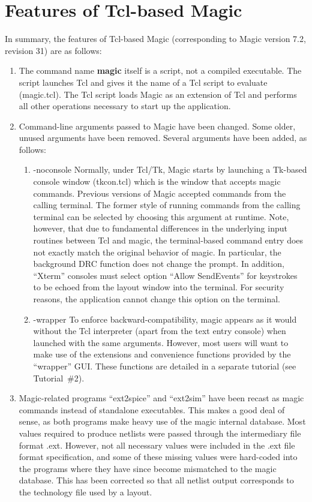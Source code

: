 \documentclass[letterpaper,twoside,12pt]{article}
\begin{document}
\section{Features of Tcl-based Magic}

In summary, the features of Tcl-based Magic (corresponding to Magic version
7.2, revision 31) are as follows:

\begin{enumerate}
   \item The command name {\bfseries magic} itself is a script, not a compiled
	executable.  The script launches Tcl and gives it the name of a Tcl
	script to evaluate ({\ttfamily magic.tcl}).  The Tcl script loads
	Magic as an extension of Tcl and performs all other operations
	necessary to start up the application.
   \item Command-line arguments passed to Magic have been changed.  Some older,
	unused arguments have been removed.  Several arguments have been
	added, as follows:
	\begin{enumerate}
	   \item {\ttfamily -noconsole}  Normally, under Tcl/Tk, Magic starts
		by launching a Tk-based console window ({\ttfamily tkcon.tcl})
		which is the window that accepts magic commands.  Previous
		versions of Magic accepted commands from the calling terminal.
		The former style of running commands from the calling terminal
		can be selected by choosing this argument at runtime.  Note,
		however, that due to fundamental differences in the underlying
		input routines between Tcl and magic, the terminal-based
		command entry does not exactly match the original behavior
		of magic.  In particular, the background DRC function does
		not change the prompt.  In addition, ``Xterm'' consoles
		must select option ``Allow SendEvents'' for keystrokes to
		be echoed from the layout window into the terminal.  For
		security reasons, the application cannot change this option
		on the terminal.
	   \item {\ttfamily -wrapper}  To enforce backward-compatibility,
		magic appears as it would without the Tcl interpreter 
		(apart from the text entry console) when launched with the
		same arguments.  However, most users will want to make use
		of the extensions and convenience functions provided by
		the ``wrapper'' GUI.  These functions are detailed in a
		separate tutorial (see Tutorial~\#2).
	\end{enumerate}
   \item Magic-related programs ``ext2spice'' and ``ext2sim'' have been
	recast as magic commands instead of standalone executables.  This
	makes a good deal of sense, as both programs make heavy use of
	the magic internal database.  Most values required to produce
	netlists were passed through the intermediary file format {\ttfamily
	.ext}.  However, not all necessary values were included in the
	{\ttfamily .ext} file format specification, and some of these
	missing values were hard-coded into the programs where they have
	since become mismatched to the magic database.  This has been
	corrected so that all netlist output corresponds to the technology
	file used by a layout.  


\end{enumerate}
\end{document}
